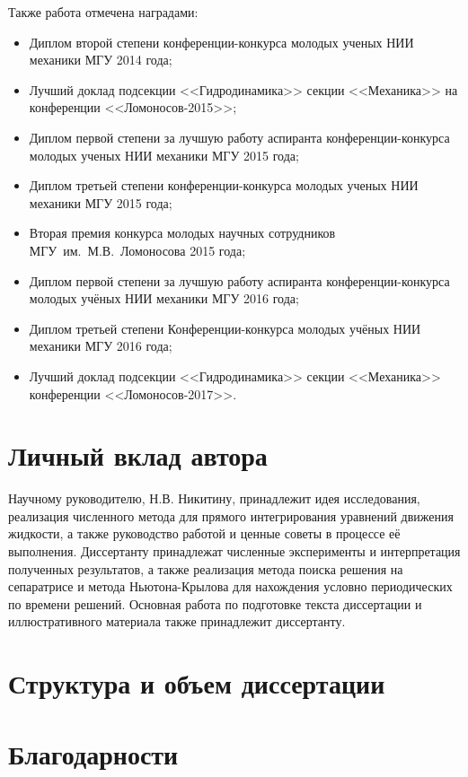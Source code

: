 Также работа отмечена наградами:
\begin{itemize}
\item Диплом второй степени конференции-конкурса молодых ученых НИИ механики МГУ 2014 года;
\item Лучший доклад подсекции <<Гидродинамика>> секции <<Механика>> на конференции <<Ломоносов-2015>>;
\item Диплом первой степени за лучшую работу аспиранта конференции-конкурса молодых ученых НИИ механики МГУ 2015 года;
\item Диплом третьей степени конференции-конкурса молодых ученых НИИ механики МГУ 2015 года;
\item Вторая премия конкурса молодых научных сотрудников МГУ~им.~М.В.~Ломоносова 2015 года;
\item Диплом первой степени за лучшую работу аспиранта конференции-конкурса молодых учёных НИИ механики МГУ 2016 года;
\item Диплом третьей степени Конференции-конкурса молодых учёных НИИ механики МГУ 2016 года;
\item Лучший доклад подсекции <<Гидродинамика>> секции <<Механика>> конференции <<Ломоносов-2017>>.
\end{itemize}


\section{Личный вклад автора}

Научному руководителю, Н.В. Никитину, принадлежит идея исследования, реализация численного метода для прямого интегрирования уравнений движения жидкости, а также руководство работой и ценные советы в процессе её выполнения. Диссертанту принадлежат численные эксперименты и интерпретация полученных результатов, а также реализация метода поиска решения на сепаратрисе и метода Ньютона-Крылова для нахождения условно периодических по времени решений. Основная работа по подготовке текста диссертации и иллюстративного материала также принадлежит диссертанту.


\section{Структура и объем диссертации}

\section{Благодарности}



